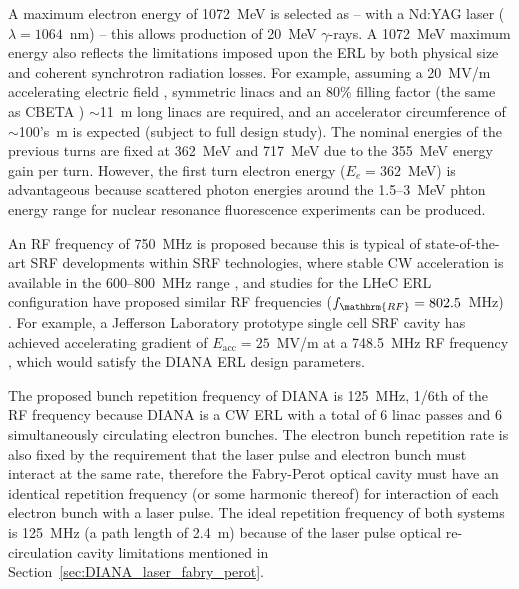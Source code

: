 \documentclass[../main.tex]{subfiles}
\begin{document}
A maximum electron energy of 1072~\si{\mega\electronvolt} is selected as -- with a Nd:YAG laser ($\lambda=1064$~\si{\nano\meter}) -- this allows production of 20~\si{\mega\electronvolt} $\gamma$-rays. A 1072~\si{\mega\electronvolt} maximum energy also reflects the limitations imposed upon the ERL by both physical size and coherent synchrotron radiation losses. For example, assuming a 20~\si{\mega\volt}/\si{\meter} accelerating electric field \cite{ben2006review}, symmetric linacs and an 80\% filling factor (the same as CBETA \cite{hoffstaetter2017cbeta}) $\sim$11~\si{\meter} long linacs are required, and an accelerator circumference of $\sim$100's~\si{\meter} is expected (subject to full design study). The nominal energies of the previous turns are fixed at 362~\si{\mega\electronvolt} and 717~\si{\mega\electronvolt} due to the 355~\si{\mega\electronvolt} energy gain per turn. However, the first turn electron energy ($E_{e}=362$~\si{\mega\electronvolt}) is advantageous because scattered photon energies around the 1.5--3~\si{\mega\electronvolt} phton energy range for nuclear resonance fluorescence experiments \cite{angell2015demonstration,quiter2011transmission} can be produced. 

An RF frequency of 750~\si{\mega\hertz} is proposed because this is typical of state-of-the-art SRF developments within SRF technologies, where stable CW acceleration is available in the 600--800~\si{\mega\hertz} range \cite{calaga2013proposal}, and studies for the LHeC ERL configuration have proposed similar RF frequencies ($f_{\mathhrm{RF}}=802.5$~\si{\mega\hertz}) \cite{agostini2021large}. For example, a Jefferson Laboratory prototype single cell SRF cavity has achieved accelerating gradient of $E_{\mathrm{acc}}=25$~\si{\mega\volt}/\si{\meter} at a 748.5~\si{\mega\hertz} RF frequency \cite{rimmer2007jlab}, which would satisfy the DIANA ERL design parameters. 

The proposed bunch repetition frequency of DIANA is 125~\si{\mega\hertz}, 1/6th of the RF frequency because DIANA is a CW ERL with a total of 6 linac passes and 6 simultaneously circulating electron bunches. The electron bunch repetition rate is also fixed by the requirement that the laser pulse and electron bunch must interact at the same rate, therefore the Fabry-Perot optical cavity must have an identical repetition frequency (or some harmonic thereof) for interaction of each electron bunch with a laser pulse. The ideal repetition frequency of both systems is 125~\si{\mega\hertz} (a path length of 2.4~\si{\meter}) because of the laser pulse optical re-circulation cavity limitations mentioned in Section~\ref{sec:DIANA_laser_fabry_perot}.
\end{document}

